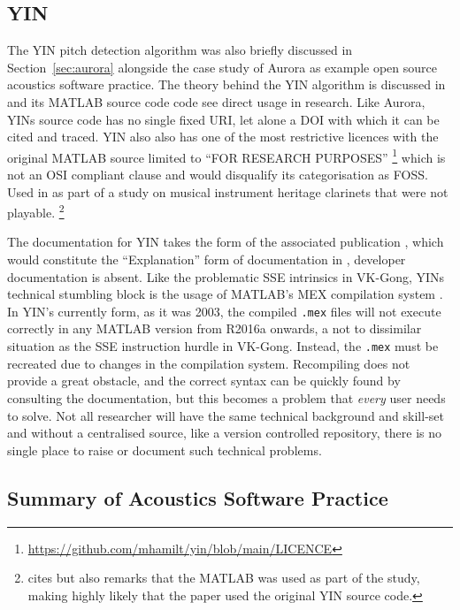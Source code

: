 \subsection{YIN}
The YIN pitch detection algorithm was also briefly discussed in Section~\ref{sec:aurora} alongside the case study of Aurora as example open source acoustics software practice.
The theory behind the YIN algorithm is discussed in \textcite{cheveigne_yin_2002} and its MATLAB source code code see direct usage in research.
Like Aurora, YINs source code has no single fixed URI, let alone a DOI with which it can be cited and traced. YIN also also has one of the most restrictive licences with the original MATLAB source limited to ``FOR RESEARCH PURPOSES''
\footnote{\url{https://github.com/mhamilt/yin/blob/main/LICENCE}}
which is not an OSI compliant clause and would disqualify its categorisation as FOSS.
Used in \textcite{bowen_assessing_2019} as part of a study on musical instrument heritage clarinets that were not playable.
\footnote{\textcite{bowen_assessing_2019} cites \textcite{cheveigne_yin_2002} but also remarks that the MATLAB was used as part of the study, making highly likely that the paper used the original YIN source code.}

The documentation for YIN takes the form of the associated publication \cite{cheveigne_yin_2002}, which would constitute the ``Explanation'' form of documentation in \textcite{procida_diataxis_2025}, developer documentation is absent.
Like the problematic SSE intrinsics in VK-Gong, YINs technical stumbling block is the usage of MATLAB's MEX compilation system \cite{matlab_mex_2025}. In YIN's currently form, as it was 2003, the compiled \texttt{.mex} files will not execute correctly in any MATLAB version from R2016a onwards, a not to dissimilar situation as the SSE instruction hurdle in VK-Gong. Instead, the \texttt{.mex} must be recreated due to changes in the compilation system. Recompiling does not provide a great obstacle, and the correct syntax can be quickly found by consulting the documentation, but this becomes a problem that \textit{every} user needs to solve. Not all researcher will have the same technical background and skill-set and without a centralised source, like a version controlled repository, there is no single place to raise or document such technical problems.


\subsection{Summary of Acoustics Software Practice}

